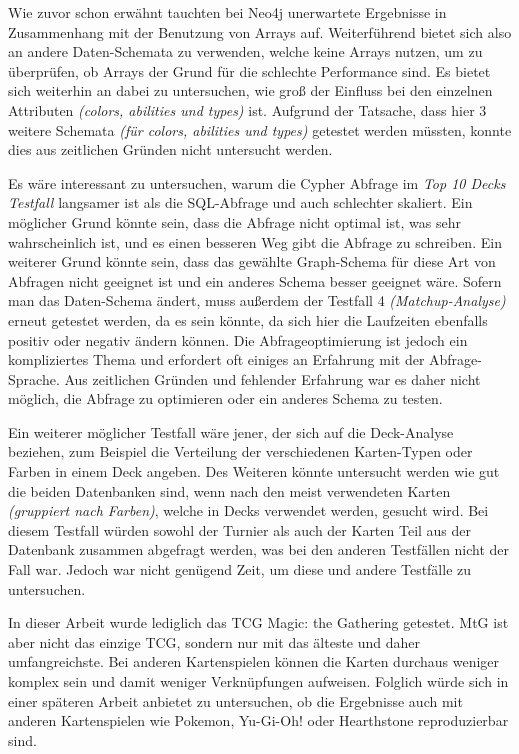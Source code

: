 Wie zuvor schon erwähnt tauchten bei Neo4j unerwartete Ergebnisse in Zusammenhang mit der Benutzung von Arrays auf. Weiterführend bietet sich also an andere Daten-Schemata zu verwenden, welche keine Arrays nutzen, um zu überprüfen, ob Arrays der Grund für die schlechte Performance sind. Es bietet sich weiterhin an dabei zu untersuchen, wie groß der Einfluss bei den einzelnen Attributen \emph{(colors, abilities und types)} ist. Aufgrund der Tatsache, dass hier 3 weitere Schemata \emph{(für colors, abilities und types)} getestet werden müssten, konnte dies aus zeitlichen Gründen nicht untersucht werden.

Es wäre interessant zu untersuchen, warum die Cypher Abfrage im \emph{Top 10 Decks Testfall} langsamer ist als die SQL-Abfrage und auch schlechter skaliert. Ein möglicher Grund könnte sein, dass die Abfrage nicht optimal ist, was sehr wahrscheinlich ist, und es einen besseren Weg gibt die Abfrage zu schreiben. Ein weiterer Grund könnte sein, dass das gewählte Graph-Schema für diese Art von Abfragen nicht geeignet ist und ein anderes Schema besser geeignet wäre. Sofern man das Daten-Schema ändert, muss außerdem der Testfall 4 \emph{(Matchup-Analyse)} erneut getestet werden, da es sein könnte, da sich hier die Laufzeiten ebenfalls positiv oder negativ ändern können. Die Abfrageoptimierung ist jedoch ein kompliziertes Thema und erfordert oft einiges an Erfahrung mit der Abfrage-Sprache. Aus zeitlichen Gründen und fehlender Erfahrung war es daher nicht möglich, die Abfrage zu optimieren oder ein anderes Schema zu testen.

Ein weiterer möglicher Testfall wäre jener, der sich auf die Deck-Analyse beziehen, zum Beispiel die Verteilung der verschiedenen Karten-Typen oder Farben in einem Deck angeben. Des Weiteren könnte untersucht werden wie gut die beiden Datenbanken sind, wenn nach den meist verwendeten Karten \emph{(gruppiert nach Farben)}, welche in Decks verwendet werden, gesucht wird. Bei diesem Testfall würden sowohl der Turnier als auch der Karten Teil aus der Datenbank zusammen abgefragt werden, was bei den anderen Testfällen nicht der Fall war. Jedoch war nicht genügend Zeit, um diese und andere Testfälle zu untersuchen.

In dieser Arbeit wurde lediglich das \ac{TCG} Magic: the Gathering getestet. \ac{MtG} ist aber nicht das einzige \ac{TCG}, sondern nur mit das älteste und daher umfangreichste. Bei anderen Kartenspielen können die Karten durchaus weniger komplex sein und damit weniger Verknüpfungen aufweisen. Folglich würde sich in einer späteren Arbeit anbietet zu untersuchen, ob die Ergebnisse auch mit anderen Kartenspielen wie Pokemon, Yu-Gi-Oh! oder Hearthstone reproduzierbar sind.
